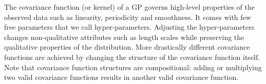 The covariance function (or kernel) of a \ac{GP} governs high-level properties of the observed data such as linearity, periodicity and smoothness.
It comes with few free parameters that we call hyper-parameters.
Adjusting the hyper-parameters changes non-qualitative attributes such as length
scales while preserving the qualitative properties of the distribution.
More drastically different covariance functions are achieved by changing the structure of the covariance function itself.
Note that covariance function structures are compositional: adding or multiplying two valid covariance functions results in another valid covariance function. 







